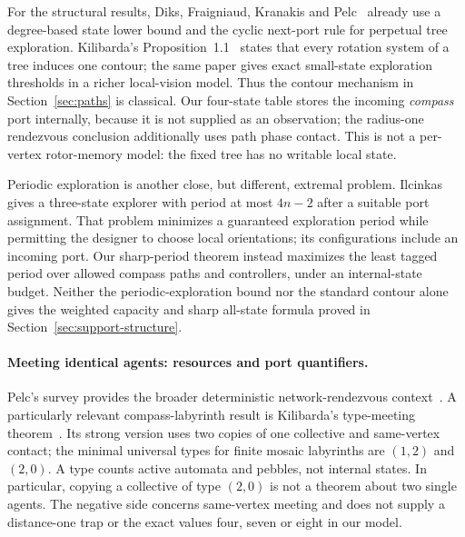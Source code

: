 For the structural results, Diks, Fraigniaud, Kranakis and
Pelc~\cite{DiksEtAl2004} already use a degree-based state lower bound and the
cyclic next-port rule for perpetual tree exploration. Kilibarda's
Proposition~1.1~\cite{Kilibarda1990} states that every rotation system of a tree
induces one contour; the same paper gives exact small-state exploration thresholds
in a richer local-vision model. Thus the contour mechanism in
Section~\ref{sec:paths} is classical. Our four-state table stores the incoming
\emph{compass} port internally, because it is not supplied as an observation;
the radius-one rendezvous conclusion additionally uses path phase contact.
This is not a per-vertex rotor-memory model: the fixed tree has no writable local
state.

Periodic exploration is another close, but different, extremal problem.
Ilcinkas~\cite{Ilcinkas2008Ports} gives a three-state explorer with period at most
$4n-2$ after a suitable port assignment. That problem minimizes a guaranteed
exploration period while permitting the designer to choose local orientations;
its configurations include an incoming port. Our sharp-period theorem instead
maximizes the least tagged period over allowed compass paths and controllers,
under an internal-state budget. Neither the periodic-exploration bound nor the
standard contour alone gives the weighted capacity and sharp all-state formula
proved in Section~\ref{sec:support-structure}.

\paragraph{Meeting identical agents: resources and port quantifiers.}
Pelc's survey provides the broader deterministic network-rendezvous
context~\cite{Pelc2012Survey}. A particularly relevant compass-labyrinth result is
Kilibarda's type-meeting theorem~\cite[Theorem~10]{Kilibarda2021}. Its strong version
uses two copies of one collective and same-vertex contact; the minimal universal
types for finite mosaic labyrinths are $(1,2)$ and $(2,0)$. A type counts active
automata and pebbles, not internal states. In particular, copying a collective of
type $(2,0)$ is not a theorem about two single agents. The negative side concerns
same-vertex meeting and does not supply a distance-one trap or the exact values
four, seven or eight in our model.

